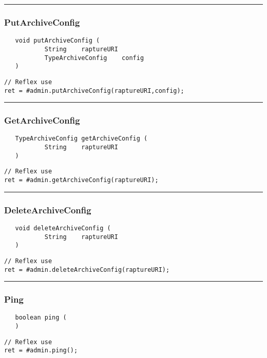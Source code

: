 \rule{15cm}{2pt}
\subsubsection{PutArchiveConfig}
\label{Api:PutArchiveConfig}
\begin{verbatim}
   void putArchiveConfig (
           String    raptureURI
           TypeArchiveConfig    config
   )
\end{verbatim}
\begin{lstlisting}[language=reflex]
// Reflex use
ret = #admin.putArchiveConfig(raptureURI,config);
\end{lstlisting}



\rule{15cm}{2pt}
\subsubsection{GetArchiveConfig}
\label{Api:GetArchiveConfig}
\begin{verbatim}
   TypeArchiveConfig getArchiveConfig (
           String    raptureURI
   )
\end{verbatim}
\begin{lstlisting}[language=reflex]
// Reflex use
ret = #admin.getArchiveConfig(raptureURI);
\end{lstlisting}



\rule{15cm}{2pt}
\subsubsection{DeleteArchiveConfig}
\label{Api:DeleteArchiveConfig}
\begin{verbatim}
   void deleteArchiveConfig (
           String    raptureURI
   )
\end{verbatim}
\begin{lstlisting}[language=reflex]
// Reflex use
ret = #admin.deleteArchiveConfig(raptureURI);
\end{lstlisting}



\rule{15cm}{2pt}
\subsubsection{Ping}
\label{Api:Ping}
\begin{verbatim}
   boolean ping (
   )
\end{verbatim}
\begin{lstlisting}[language=reflex]
// Reflex use
ret = #admin.ping();
\end{lstlisting}



